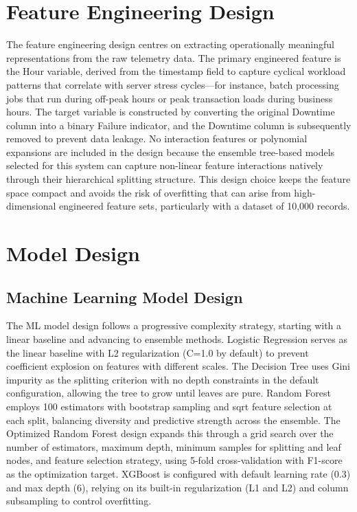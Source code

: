 \documentclass[12pt,letterpaper]{report}
\begin{document}
\section{Feature Engineering Design}

The feature engineering design centres on extracting operationally meaningful representations from the raw telemetry data. The primary engineered feature is the Hour variable, derived from the timestamp field to capture cyclical workload patterns that correlate with server stress cycles---for instance, batch processing jobs that run during off-peak hours or peak transaction loads during business hours. The target variable is constructed by converting the original Downtime column into a binary Failure indicator, and the Downtime column is subsequently removed to prevent data leakage. No interaction features or polynomial expansions are included in the design because the ensemble tree-based models selected for this system can capture non-linear feature interactions natively through their hierarchical splitting structure. This design choice keeps the feature space compact and avoids the risk of overfitting that can arise from high-dimensional engineered feature sets, particularly with a dataset of 10,000 records.

\section{Model Design}

\subsection{Machine Learning Model Design}

The ML model design follows a progressive complexity strategy, starting with a linear baseline and advancing to ensemble methods. Logistic Regression serves as the linear baseline with L2 regularization (C=1.0 by default) to prevent coefficient explosion on features with different scales. The Decision Tree uses Gini impurity as the splitting criterion with no depth constraints in the default configuration, allowing the tree to grow until leaves are pure. Random Forest employs 100 estimators with bootstrap sampling and sqrt feature selection at each split, balancing diversity and predictive strength across the ensemble. The Optimized Random Forest design expands this through a grid search over the number of estimators, maximum depth, minimum samples for splitting and leaf nodes, and feature selection strategy, using 5-fold cross-validation with F1-score as the optimization target. XGBoost is configured with default learning rate (0.3) and max depth (6), relying on its built-in regularization (L1 and L2) and column subsampling to control overfitting.
\end{document}
